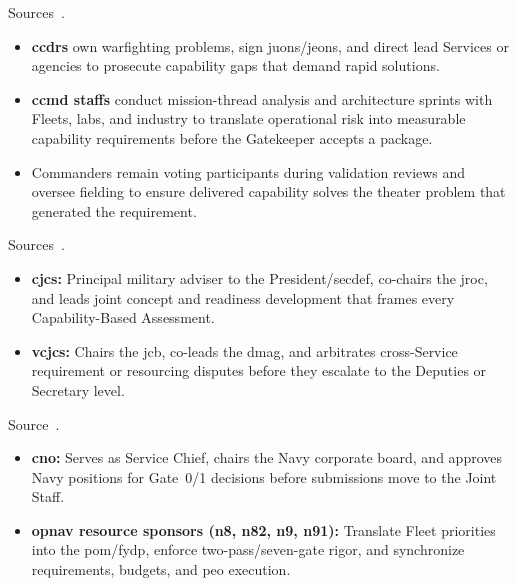 \documentclass[../main.tex]{subfiles}
\begin{document}
\begin{description}[style=nextline, labelsep=0.5em, font=\bfseries]
\item[\textbf{Combatant command sponsors.}]
Sources~\autocite{edo-2-1-1-command-structures-2025,jcids-manual-2021}.
      \begin{itemize}
        \item \textbf{\ac{ccdr}s} own warfighting problems, sign \acp{juon}/\acp{jeon}, and direct lead Services or agencies to prosecute capability gaps that demand rapid solutions.
        \item \textbf{\ac{ccmd} staffs} conduct mission-thread analysis and architecture sprints with Fleets, labs, and industry to translate operational risk into measurable capability requirements before the Gatekeeper accepts a package.
        \item Commanders remain voting participants during validation reviews and oversee fielding to ensure delivered capability solves the theater problem that generated the requirement.
      \end{itemize}

\item[\textbf{Joint Chiefs leadership.}]
Sources~\autocite{edo-2-1-1-command-structures-2025,jcids-manual-2021,USC-10-181}.
      \begin{itemize}
        \item \textbf{\ac{cjcs}:} Principal military adviser to the President/\ac{secdef}, co-chairs the \ac{jroc}, and leads joint concept and readiness development that frames every Capability-Based Assessment.
        \item \textbf{\ac{vcjcs}:} Chairs the \ac{jcb}, co-leads the \ac{dmag}, and arbitrates cross-Service requirement or resourcing disputes before they escalate to the Deputies or Secretary level.
      \end{itemize}

\item[\textbf{OPNAV corporate leadership.}]
Source~\autocite{edo-2-1-1-command-structures-2025}.
      \begin{itemize}
        \item \textbf{\ac{cno}:} Serves as Service Chief, chairs the Navy corporate board, and approves Navy positions for Gate~0/1 decisions before submissions move to the Joint Staff.
        \item \textbf{\ac{opnav} resource sponsors (\ac{n8}, \ac{n82}, \ac{n9}, \ac{n91}):} Translate Fleet priorities into the \ac{pom}/\ac{fydp}, enforce two-pass/seven-gate rigor, and synchronize requirements, budgets, and \ac{peo} execution.
      \end{itemize}


\end{description}
\end{document}
